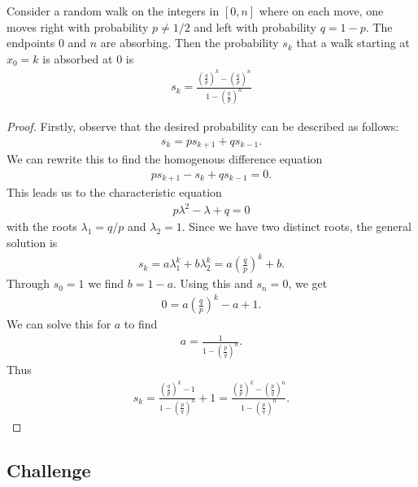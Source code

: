 \documentclass{article}
\begin{document}
\begin{claim*}
	Consider a random walk on the integers in $[0,n]$ where on each move, one moves right with
	probability $p\not=1/2$ and left with probability $q=1-p$. The endpoints $0$ and $n$ are absorbing.
	Then the probability $s_k$ that a walk starting at $x_0=k$ is absorbed at $0$ is
	\begin{align*}
		s_k = \frac{\left(\frac{q}{p}\right)^k-\left(\frac{q}{p}\right)^n}{1-\left(\frac{q}{p}\right)^n}
	\end{align*}
\end{claim*}
\begin{proof}
	Firstly, observe that the desired probability can be described as follows:
	\begin{align*}
		s_{k} = ps_{k+1} + qs_{k-1}.
	\end{align*}
	We can rewrite this to find the homogenous difference equation
	\begin{align*}
		ps_{k+1} - s_k + qs_{k-1} = 0.
	\end{align*}
	This leads us to the characteristic equation
	\begin{align*}
		p\lambda^2 - \lambda + q = 0
	\end{align*}
	with the roots $\lambda_1 = q/p$ and $\lambda_2 = 1$.
	Since we have two distinct roots, the general solution is
	\begin{align*}
		s_k = a\lambda_1^k + b\lambda_2^k = a\left(\frac{q}{p}\right)^k + b.
	\end{align*}
	Through $s_0=1$ we find $b=1-a$. Using this and $s_n=0$, we get
	\begin{align*}
		0 = a\left(\frac{q}{p}\right)^k - a + 1.
	\end{align*}
	We can solve this for $a$ to find
	\begin{align*}
		a = \frac{1}{1-\left(\frac{p}{q}\right)^n}.
	\end{align*}
	Thus
	\begin{align*}
		s_k =\frac{\left(\frac{q}{p}\right)^k-1}{1-\left(\frac{p}{q}\right)^n}+1
		=\frac{\left(\frac{q}{p}\right)^k-\left(\frac{p}{q}\right)^n}{1-\left(\frac{p}{q}\right)^n}.
	\end{align*}
\end{proof}

\subsection*{Challenge}
\end{document}
